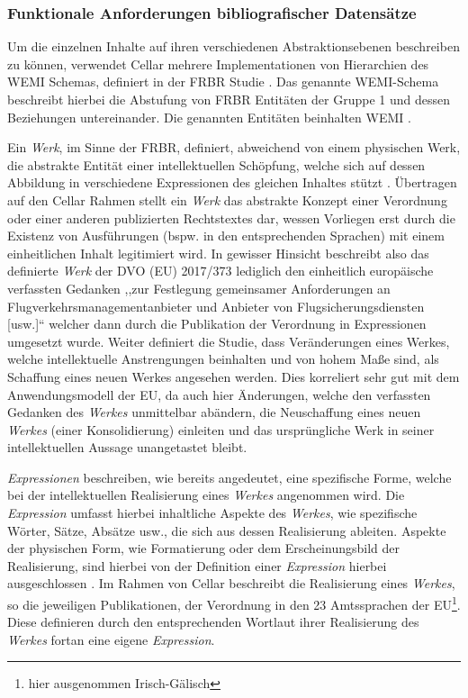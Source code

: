 \subsubsection{Funktionale Anforderungen bibliografischer Datensätze}\label{frbr}
        
    Um die einzelnen Inhalte auf ihren verschiedenen Abstraktionsebenen beschreiben zu können, verwendet Cellar mehrere Implementationen von Hierarchien des \acs{WEMI} Schemas, definiert in der \ac{FRBR}  Studie \cite[S. 29f]{eu_cellar}.
    Das genannte \acs{WEMI}-Schema beschreibt hierbei die Abstufung von \ac{FRBR} Entitäten der Gruppe 1 und dessen Beziehungen untereinander. 
    Die genannten Entitäten beinhalten \ac{WEMI} \cite[12]{eu_frbr}.

    \medskip
    Ein \textit{Werk}, im Sinne der \ac{FRBR}, definiert, abweichend von einem physischen Werk, die abstrakte Entität einer intellektuellen Schöpfung, welche sich auf dessen Abbildung in verschiedene Expressionen des gleichen Inhaltes stützt \cite[S. 16f]{eu_frbr}.
    Übertragen auf den Cellar Rahmen stellt ein \textit{Werk} das abstrakte Konzept einer Verordnung oder einer anderen publizierten Rechtstextes dar, wessen Vorliegen erst durch die Existenz von Ausführungen (bspw. in den entsprechenden Sprachen) mit einem einheitlichen Inhalt legitimiert wird. 
    In gewisser Hinsicht beschreibt also das definierte \textit{Werk} der \acs{DVO} (\acs{EU}) 2017/373 lediglich den einheitlich europäische verfassten Gedanken ,,zur Festlegung gemeinsamer Anforderungen an Flugverkehrsmanagementanbieter und Anbieter von Flugsicherungsdiensten [usw.]`` welcher dann durch die Publikation der Verordnung in Expressionen umgesetzt wurde.
    Weiter definiert die Studie, dass Veränderungen eines Werkes, welche intellektuelle Anstrengungen beinhalten und von hohem Maße sind, als Schaffung eines neuen Werkes angesehen werden. \cite[17]{eu_frbr} 
    Dies korreliert sehr gut mit dem Anwendungsmodell der \ac{EU}, da auch hier Änderungen, welche den verfassten Gedanken des \textit{Werkes} unmittelbar abändern, die Neuschaffung eines neuen \textit{Werkes} (einer Konsolidierung) einleiten und das ursprüngliche Werk in seiner intellektuellen Aussage unangetastet bleibt.
    
    \medskip
    \textit{Expressionen} beschreiben, wie bereits angedeutet, eine spezifische Forme, welche bei der intellektuellen Realisierung eines \textit{Werkes} angenommen wird.
    Die \textit{Expression} umfasst hierbei inhaltliche Aspekte des \textit{Werkes}, wie spezifische Wörter, Sätze, Absätze usw., die sich aus dessen Realisierung ableiten. 
    Aspekte der physischen Form, wie Formatierung oder dem Erscheinungsbild der Realisierung, sind hierbei von der Definition einer \textit{Expression} hierbei ausgeschlossen \cite[S. 18f]{eu_frbr}.
    Im Rahmen von Cellar beschreibt die Realisierung eines \textit{Werkes}, so die jeweiligen Publikationen, der Verordnung in den 23 Amtssprachen der EU\footnote{hier ausgenommen Irisch-Gälisch}.
    Diese definieren durch den entsprechenden Wortlaut ihrer Realisierung des \textit{Werkes} fortan eine eigene \textit{Expression}.
    
